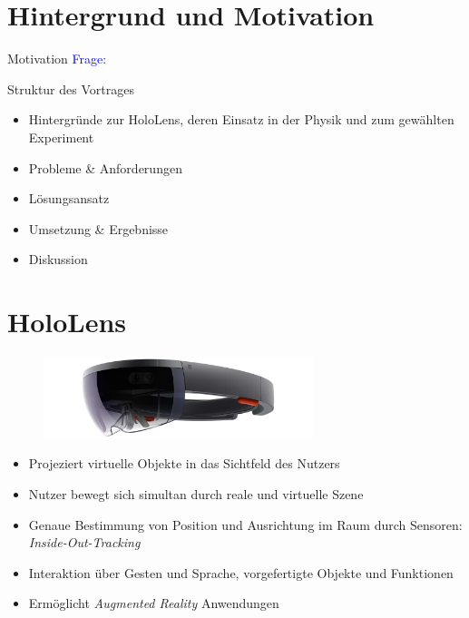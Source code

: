 \part{Hintergrund und Motivation}
\label{part:intro}

\begin{frame}[fragile]{Motivation}
\vspace{10px}
\textcolor{blue}{Frage:} 
\end{frame}

\begin{frame}[fragile]{Struktur des Vortrages}
\begin{itemize}
	\item Hintergründe zur HoloLens, deren Einsatz in der Physik und zum gewählten Experiment
	\item Probleme \& Anforderungen
	\item Lösungsansatz
	\item Umsetzung \& Ergebnisse
	\item Diskussion
\end{itemize}
\end{frame}

\part{HoloLens}
\label{part:hololens}
\begin{frame}[fragile]{}
\begin{figure}[h!]
	\centering
	\includegraphics[width=0.7\textwidth]{images/papers/hololens.jpg}
\end{figure}
\begin{itemize}
	\item Projeziert virtuelle Objekte in das Sichtfeld des Nutzers
	\item Nutzer bewegt sich simultan durch reale und virtuelle Szene
	\item Genaue Bestimmung von Position und Ausrichtung im Raum durch Sensoren: \textit{Inside-Out-Tracking}
	\item Interaktion über Gesten und Sprache, vorgefertigte Objekte und Funktionen
	\item Ermöglicht \textit{Augmented Reality} Anwendungen
\end{itemize}	
\end{frame}

